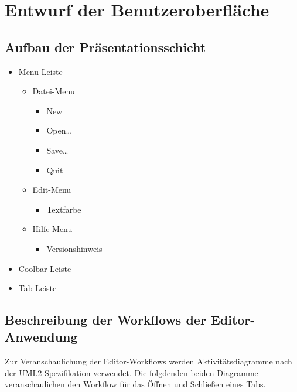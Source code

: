 \section{Entwurf der Benutzeroberfläche}

\subsection{Aufbau der Präsentationsschicht}

\begin{itemize}
\item Menu-Leiste
    \begin{itemize}
        \item Datei-Menu
        \begin{itemize}
            \item New
            \item Open\dots
            \item Save\dots
            \item Quit        
        \end{itemize}
        \item Edit-Menu
        \begin{itemize}
            \item Textfarbe
        \end{itemize}
        \item Hilfe-Menu
        \begin{itemize}
            \item Versionshinweis        
        \end{itemize}
    \end{itemize}
\item Coolbar-Leiste
\item Tab-Leiste
\end{itemize}



\subsection{Beschreibung der Workflows der Editor-Anwendung}
Zur Veranschaulichung der Editor-Workflows werden Aktivitätsdiagramme nach der UML2-Spezifikation verwendet.
Die folgdenden beiden Diagramme veranschaulichen den Workflow für das Öffnen und Schließen eines Tabs.


